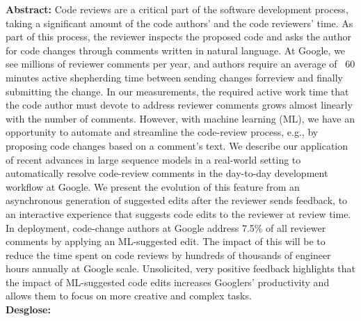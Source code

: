 \documentclass{article}
\begin{document}
\textbf{Abstract:} Code reviews are a critical part of the software development process, taking a significant amount of the code authors' and the code reviewers' time. As part of this process, the reviewer inspects the proposed code and asks the author for code changes through comments written in natural language. At Google, we see millions of reviewer comments per year, and authors require an average of ~60 minutes active shepherding time between sending changes forreview and finally submitting the change. In our measurements, the required active work time that the code author must devote to address reviewer comments grows almost linearly with the number of comments. However, with machine learning (ML), we have an opportunity to automate and streamline the code-review process, e.g., by proposing code changes based on a comment's text. We describe our application of recent advances in large sequence models in a real-world setting to automatically resolve code-review comments in the day-to-day development workflow at Google. We present the evolution of this feature from an asynchronous generation of suggested edits after the reviewer sends feedback, to an interactive experience that suggests code edits to the reviewer at review time. In deployment, code-change authors at Google address 7.5\% of all reviewer comments by applying an ML-suggested edit. The impact of this will be to reduce the time spent on code reviews by hundreds of thousands of engineer hours annually at Google scale. Unsolicited, very positive feedback highlights that the impact of ML-suggested code edits increases Googlers' productivity and allows them to focus on more creative and complex tasks. \\

\textbf{Desglose:}
\end{document}
